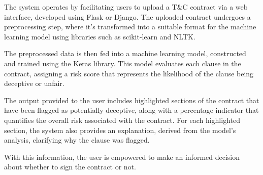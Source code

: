 The system operates by facilitating users to upload a T&C contract via a web interface, developed using Flask or Django. The uploaded contract undergoes a preprocessing step, where it's transformed into a suitable format for the machine learning model using libraries such as scikit-learn and NLTK.

The preprocessed data is then fed into a machine learning model, constructed and trained using the Keras library. This model evaluates each clause in the contract, assigning a risk score that represents the likelihood of the clause being deceptive or unfair.

The output provided to the user includes highlighted sections of the contract that have been flagged as potentially deceptive, along with a percentage indicator that quantifies the overall risk associated with the contract. For each highlighted section, the system also provides an explanation, derived from the model's analysis, clarifying why the clause was flagged.

With this information, the user is empowered to make an informed decision about whether to sign the contract or not. 

